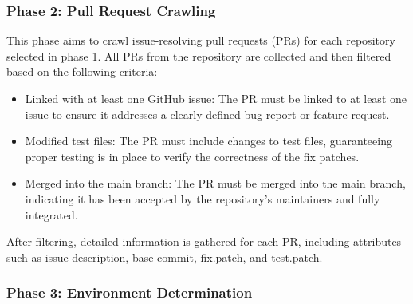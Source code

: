 \documentclass[11pt, a4paper, logo, copyright, nonumbering]{seed}
\begin{document}
\subsubsection{Phase 2: Pull Request Crawling}
\label{sec:phase2_pull_request_crawling}

This phase aims to crawl issue-resolving pull requests (PRs) for each repository selected in phase 1.
All PRs from the repository are collected and then filtered based on the following criteria:
\begin{itemize}[leftmargin=*]
    \item Linked with at least one GitHub issue: The PR must be linked to at least one issue to ensure it addresses a clearly defined bug report or feature request.
    \item Modified test files: The PR must include changes to test files, guaranteeing proper testing is in place to verify the correctness of the fix patches.
    \item Merged into the main branch: The PR must be merged into the main branch, indicating it has been accepted by the repository's maintainers and fully integrated.
\end{itemize}
After filtering, detailed information is gathered for each PR, including attributes such as issue description, base commit, fix.patch, and test.patch.

\subsubsection{Phase 3: Environment Determination}


\end{document}
